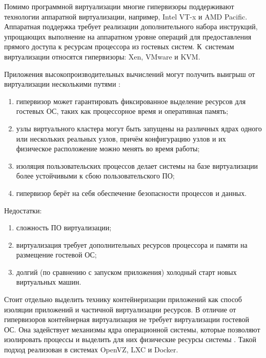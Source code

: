 Помимо программной виртуализации многие гипервизоры поддерживают технологии аппаратной виртуализации, например, Intel VT-x и AMD Pacific. Аппаратная поддержка требует реализации дополнительного набора инструкций, упрощающих выполнение на аппаратном уровне операций для предоставления прямого доступа к ресурсам процессора из гостевых систем. К~системам виртуализации относятся гипервизоры: Xen, VMware и KVM. 



Приложения высокопроизводительных вычислений могут получить выигрыш от виртуализации несколькими путями \cite{Mergen2006Virtualization}: 

\begin{enumerate}

\item гипервизор может гарантировать фиксированное выделение ресурсов для гостевых ОС, таких как процессорное время и оперативная память;

\item узлы виртуального кластера могут быть запущены на различных ядрах одного или нескольких реальных узлов, причём конфигурацию узлов и их физическое расположение можно менять во время работы;

\item изоляция пользовательских процессов делает системы на базе виртуализации более устойчивыми к сбою пользовательского ПО;

\item гипервизор берёт на себя обеспечение безопасности  процессов и данных.

\end{enumerate}

Недостатки:

\begin{enumerate}

\item сложность ПО виртуализации;

\item виртуализация требует дополнительных ресурсов процессора и памяти на размещение гостевой ОС;

\item долгий (по сравнению с запуском приложения) холодный старт новых виртуальных машин.

\end{enumerate}



Стоит отдельно выделить технику контейнеризации приложений как способ изоляции приложений и частичной виртуализации ресурсов. В отличие от гипервизоров контейнерная виртуализация не требует виртуализации гостевой ОС. Она задействует механизмы ядра операционной системы, которые позволяют изолировать процессы и выделить для них физические ресурсы системы \cite{Xavier2013Performance}. Такой подход реализован в системах OpenVZ, LXC и Docker.



